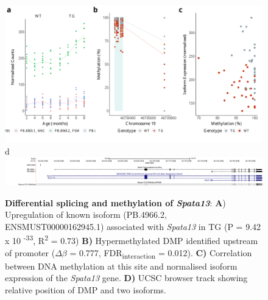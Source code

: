 \begin{figure}[ht]
	\includegraphics[page=2,scale = 0.4]{Figures/WholeDifferentialAnalysis_DMPDMR.pdf}
	\\
	\hspace*{0.2cm}\vspace{0.5cm}\large d
	\\
	\includegraphics[page=1,trim={1.5cm 0 0 0},scale = 0.9]{Figures/SPATA13_DMP.pdf}
	\captionsetup{width=0.95\textwidth}
	\caption[Differential splicing and methylation of \textit{Spata13}]%
	{\textbf{Differential splicing and methylation of \textit{Spata13}}: \textbf{A}) Upregulation of known isoform (PB.4966.2, ENSMUST00000162945.1) associated with \textit{Spata13} in TG (P = 9.42 x 10 \textsuperscript{-33}, R\textsuperscript{2} = 0.73) \textbf{B)} Hypermethylated DMP identified upstream of promoter ($\Delta$$\beta$ = 0.777, FDR\textsubscript{interaction} = 0.012). \textbf{C)} Correlation between DNA methylation at this site and normalised isoform expression of the \textit{Spata13} gene. \textbf{D)} UCSC browser track showing relative position of DMP and two isoforms. }    
	\label{fig:IntMeth_Spata13}
\end{figure}


